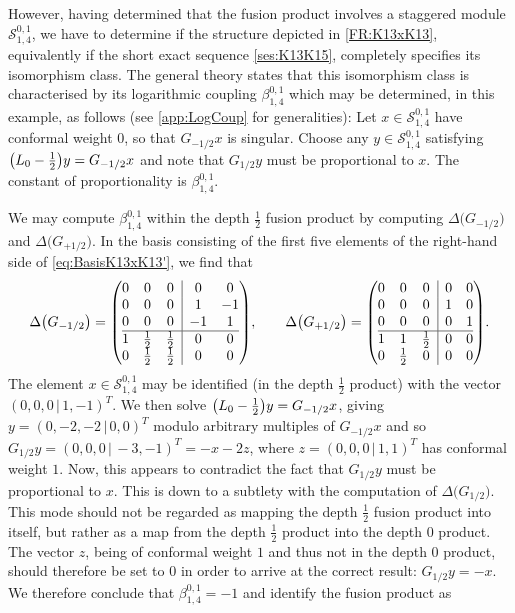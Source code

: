\documentclass[a4paper,reqno,12pt]{report}
\makeatletter
\theoremstyle{definition}
\numberwithin{equation}{section}
\newenvironment{amatrix}[1]{\left( \begin{array}{@{}#1@{}}}{\end{array} \right)}
\let\originalleft\left     %
\let\originalright\right
\renewcommand{\left}{\mathopen{}\mathclose\bgroup\originalleft}
\renewcommand{\right}{\aftergroup\egroup\originalright}
\newcommand{\brac}[1]{\left( #1 \right)}
\newcommand{\Stag}[2]{\mathcal{S}_{#1}^{#2}} %
\newcommand{\logcoup}[2]{\beta_{#1}^{#2}}    %
\newcommand{\coproductsymb}{\Delta}                                                %
\newcommand{\coproduct}[1]{\coproductsymb \bigl( #1 \bigr)}                        %
\newcommand{\rhs}{right-hand side}
\theoremstyle{plain}
\makeatother
\begin{document}
However, having determined that the fusion product involves a staggered module $\Stag{1,4}{0,1}$, we have to determine if the structure depicted in \eqref{FR:K13xK13}, equivalently if the short exact sequence \eqref{ses:K13K15}, completely specifies its isomorphism class.  The general theory states that this isomorphism class is characterised by its logarithmic coupling $\logcoup{1,4}{0,1}$ which may be determined, in this example, as follows (see \cref{app:LogCoup} for generalities):  Let $x \in \Stag{1,4}{0,1}$ have conformal weight $0$, so that $G_{-1/2} x$ is singular.  Choose any $y \in \Stag{1,4}{0,1}$ satisfying $\brac{L_0 - \frac{1}{2}} y = G_{-1/2} x$ and note that $G_{1/2} y$ must be proportional to $x$.  The constant of proportionality is $\logcoup{1,4}{0,1}$.

We may compute $\logcoup{1,4}{0,1}$ within the depth $\frac{1}{2}$ fusion product by computing $\coproduct{G_{-1/2}}$ and $\coproduct{G_{+1/2}}$.  In the basis consisting of the first five elements of the \rhs{} of \eqref{eq:BasisK13xK13'}, we find that
\begin{equation}
\coproduct{G_{-1/2}} = 
\begin{amatrix}{ccc|cc}
0 & 0           & 0           & 0  & 0  \\
0 & 0           & 0           & 1  & -1 \\
0 & 0           & 0			  & -1 & 1  \\
\hline
1 & \frac{1}{2} & \frac{1}{2} & 0  & 0  \\
0 & \frac{1}{2} & \frac{1}{2} & 0  & 0		 		   		  
\end{amatrix}
, \qquad \coproduct{G_{+1/2}} = 
\begin{amatrix}{ccc|cc}
0 & 0           & 0           & 0 & 0 \\
0 & 0           & 0           & 1 & 0 \\
0 & 0           & 0			  & 0 & 1 \\
\hline
1 & 1           & \frac{1}{2} & 0 & 0 \\
0 & \frac{1}{2} & 0           & 0 & 0		 		   		  
\end{amatrix}
.
\end{equation}
The element $x \in \Stag{1,4}{0,1}$ may be identified (in the depth $\frac{1}{2}$ product) with the vector $(0,0,0\,\vert\, 1,-1)^T$.  We then solve $\brac{L_0 - \frac{1}{2}} y = G_{-1/2} x$, giving $y = (0,-2,-2\,\vert\, 0,0)^T$ modulo arbitrary multiples of $G_{-1/2} x$ and so $G_{1/2} y = (0,0,0\,\vert\, -3,-1)^T = -x-2z$, where $z = (0,0,0\,\vert\, 1,1)^T$ has conformal weight $1$.  Now, this appears to contradict the fact that $G_{1/2} y$ must be proportional to $x$.  This is down to a subtlety with the computation of $\coproduct{G_{1/2}}$.  This mode should not be regarded as mapping the depth $\frac{1}{2}$ fusion product into itself, but rather as a map from the depth $\frac{1}{2}$ product into the depth $0$ product.  The vector $z$, being of conformal weight $1$ and thus not in the depth $0$ product, should therefore be set to $0$ in order to arrive at the correct result:  $G_{1/2} y = -x$.  We therefore conclude that $\logcoup{1,4}{0,1} = -1$ and identify the fusion product as
\end{document}
